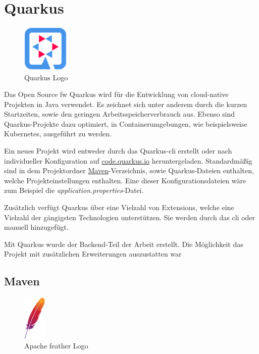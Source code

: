 \section{Quarkus}
\begin{figure}
    \begin{center}
      \includegraphics[width=0.2\textwidth]{pics/logos/quarkus.png}
     \caption{Quarkus Logo}
    \end{center}
  \end{figure}
Das Open Source \gls{fw} Quarkus wird für die Entwicklung von cloud-native Projekten in Java verwendet. 
Es zeichnet sich unter anderem durch die kurzen Startzeiten, sowie den geringen Arbeitsspeicherverbrauch aus. 
Ebenso sind Quarkus-Projekte dazu optimiert, in Containerumgebungen, wie beispielsweise Kubernetes, ausgeführt zu werden.
\cite{QuarkusHomepage, QuarkusAbout}

Ein neues Projekt wird entweder durch das Quarkus-\gls{cli} erstellt oder nach individueller Konfiguration auf \href{https://code.quarkus.io}{code.quarkus.io} heruntergeladen. 
Standardmäßig sind in dem Projektordner \hyperref[ch::MavenTool]{Maven}-Verzeichnis, sowie Quarkus-Dateien enthalten, welche Projekteinstellungen enthalten. 
Eine dieser Konfigurationsdateien wäre zum Beispiel die \emph{application.properties}-Datei. 
\cite{QuarkusAbout, QuarkusFirstApplication}

Zusätzlich verfügt Quarkus über eine Vielzahl von Extensions, welche eine Vielzahl der gängigsten Technologien unterstützen.
Sie werden durch das \gls{cli} oder manuell hinzugefügt. 
\cite{QuarkusAbout, QuarkusFirstApplication}

Mit Quarkus wurde der Backend-Teil der Arbeit erstellt. 
Die Möglichkeit das Projekt mit zusätzlichen Erweiterungen auszustatten war 

\subsection{Maven}
\label{ch::MavenTool}
\begin{figure}
    \begin{center}
        \includegraphics[width=0.1\textwidth]{pics/logos/asf.jpg}
        \caption{Apache feather Logo}
    \end{center}
\end{figure}

